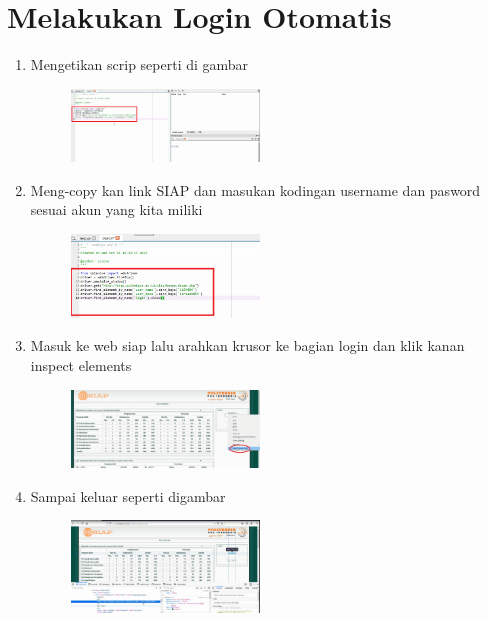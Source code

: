 \chapter*{Melakukan Login Otomatis}

\begin{enumerate}
	\item Mengetikan scrip seperti di gambar 
	\begin{figure} [h]
	\includegraphics[width=5cm]{login/1.png}
	\centering
	\end{figure}
	
	\item Meng-copy kan link SIAP dan masukan kodingan username dan pasword sesuai akun yang kita miliki
	\begin{figure} [h]
	\includegraphics[width=5cm]{login/2.png}
	\centering
	\end{figure}

	\item Masuk ke web siap lalu arahkan krusor ke bagian login dan klik kanan inspect elements 
	\begin{figure} [h]
	\includegraphics[width=5cm]{login/3.png}
	\centering
	\end{figure}
	
	\item Sampai keluar seperti digambar
	\begin{figure} [h]
	\includegraphics[width=5cm]{login/4.png}
	\centering
	\end{figure}
	

\end{enumerate}
